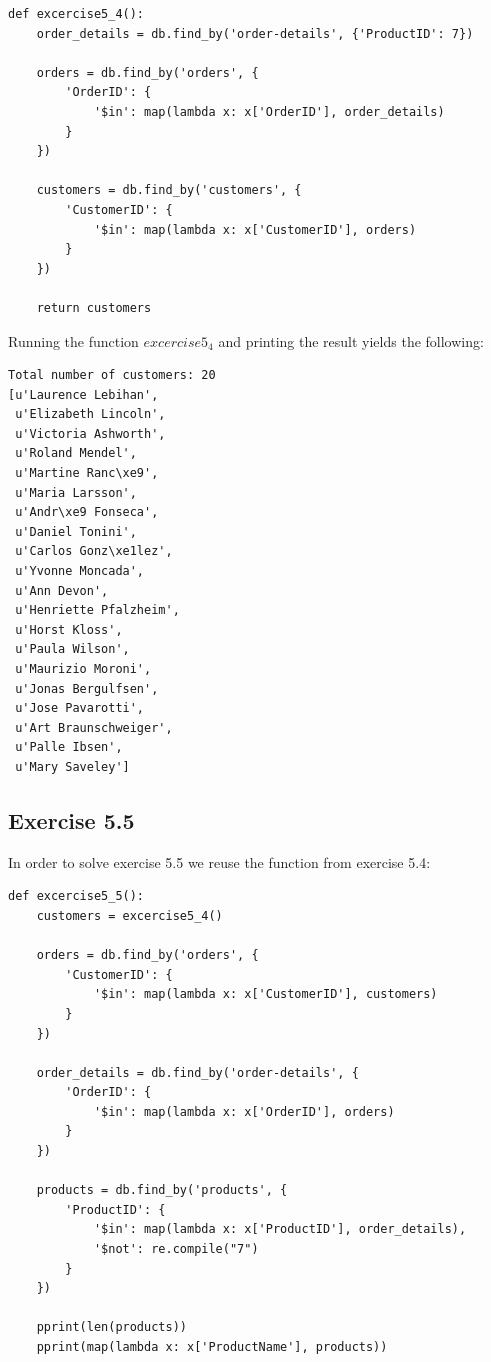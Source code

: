 \documentclass{article}
\begin{document}
\begin{lstlisting}
def excercise5_4():
    order_details = db.find_by('order-details', {'ProductID': 7})

    orders = db.find_by('orders', {
        'OrderID': {
            '$in': map(lambda x: x['OrderID'], order_details)
        }
    })

    customers = db.find_by('customers', {
        'CustomerID': {
            '$in': map(lambda x: x['CustomerID'], orders)
        }
    })

    return customers
\end{lstlisting}

Running the function $excercise5_4$ and printing the result yields the following:

\begin{lstlisting}
Total number of customers: 20
[u'Laurence Lebihan',
 u'Elizabeth Lincoln',
 u'Victoria Ashworth',
 u'Roland Mendel',
 u'Martine Ranc\xe9',
 u'Maria Larsson',
 u'Andr\xe9 Fonseca',
 u'Daniel Tonini',
 u'Carlos Gonz\xe1lez',
 u'Yvonne Moncada',
 u'Ann Devon',
 u'Henriette Pfalzheim',
 u'Horst Kloss',
 u'Paula Wilson',
 u'Maurizio Moroni',
 u'Jonas Bergulfsen',
 u'Jose Pavarotti',
 u'Art Braunschweiger',
 u'Palle Ibsen',
 u'Mary Saveley']
\end{lstlisting}

\subsection{Exercise 5.5}
\label{sub:Exercise 5.5}

In order to solve exercise 5.5 we reuse the function from exercise 5.4:

\begin{lstlisting}
def excercise5_5():
    customers = excercise5_4()

    orders = db.find_by('orders', {
        'CustomerID': {
            '$in': map(lambda x: x['CustomerID'], customers)
        }
    })

    order_details = db.find_by('order-details', {
        'OrderID': {
            '$in': map(lambda x: x['OrderID'], orders)
        }
    })

    products = db.find_by('products', {
        'ProductID': {
            '$in': map(lambda x: x['ProductID'], order_details),
            '$not': re.compile("7")
        }
    })

    pprint(len(products))
    pprint(map(lambda x: x['ProductName'], products))
\end{lstlisting}
\end{document}
